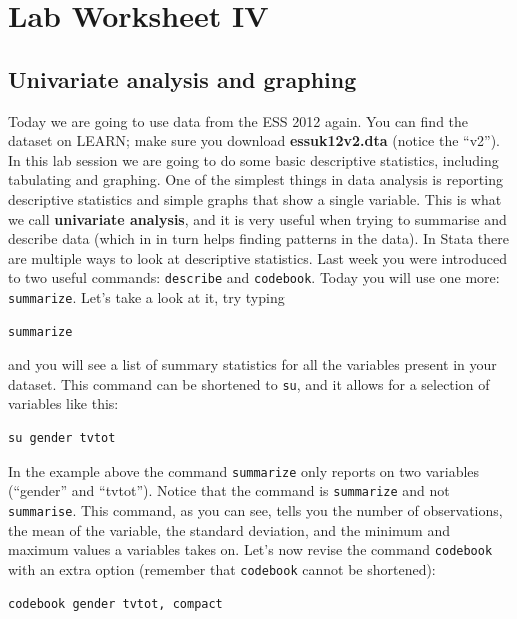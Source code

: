 \documentclass{article}
\begin{document}
\pagestyle{fancy}
\fancyhf{}

\section*{\hfil Lab Worksheet IV \hfil}
\subsection*{Univariate analysis and graphing}

Today we are going to use data from the ESS 2012 again. You can find the dataset on LEARN; make sure you download \textbf{essuk12v2.dta} (notice the ``v2''). In this lab session we are going to do some basic descriptive statistics, including tabulating and graphing. One of the simplest things in data analysis is reporting descriptive statistics and simple graphs that show a single variable. This is what we call \textbf{univariate analysis}, and it is very useful when trying to summarise and describe data (which in in turn helps finding patterns in the data). In Stata there are multiple ways to look at descriptive statistics. Last week you were introduced to two useful commands: \texttt{describe} and \texttt{codebook}. Today you will use one more: \texttt{summarize}. Let’s take a look at it, try typing

\begin{lstlisting}
summarize
\end{lstlisting} 

and you will see a list of summary statistics for all the variables present in your dataset. This command can be shortened to \texttt{su}, and it allows for a selection of variables like this:

\begin{lstlisting}
su gender tvtot
\end{lstlisting}

In the example above the command \texttt{summarize} only reports on two variables (``gender'' and ``tvtot''). Notice that the command is \texttt{summarize} and not \texttt{summarise}. This command, as you can see, tells you the number of observations, the mean of the variable, the standard deviation, and the minimum and maximum values a variables takes on. Let's now revise the command \texttt{codebook} with an extra option (remember that \texttt{codebook} cannot be shortened):

\begin{lstlisting}
codebook gender tvtot, compact
\end{lstlisting}
\end{document}
